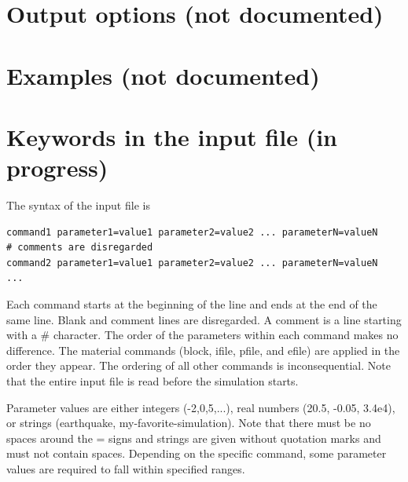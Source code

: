 \documentclass[11pt]{report}
\begin{document}

\chapter{Output options (not documented)}

\chapter{Examples (not documented)} \label{sec:examples}

\chapter{Keywords in the input file (in progress)}\label{chap:keywords}
The syntax of the input file is
\begin{verbatim}
command1 parameter1=value1 parameter2=value2 ... parameterN=valueN
# comments are disregarded
command2 parameter1=value1 parameter2=value2 ... parameterN=valueN
...
\end{verbatim}
Each command starts at the beginning of the line and ends at the end of the same line. Blank and
comment lines are disregarded. A comment is a line starting with a \# character. The order of the
parameters within each command makes no difference. The material commands (block, ifile, pfile, and efile)
are applied in the order they appear. The ordering of all other commands is inconsequential. Note
that the entire input file is read before the simulation starts.

Parameter values are either integers (-2,0,5,...), real numbers (20.5, -0.05, 3.4e4), or strings
(earthquake, my-favorite-simulation). Note that there must be no spaces around the = signs and
strings are given without quotation marks and must not contain spaces. Depending on the specific
command, some parameter values are required to fall within specified ranges.
\end{document}
